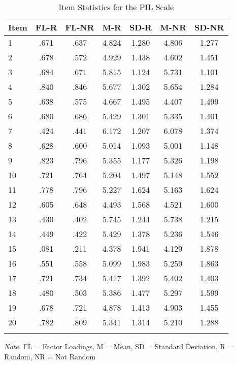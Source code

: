 \documentclass[english,man, mask]{apa6}
\theoremstyle{definition}
\theoremstyle{definition}
\theoremstyle{definition}
\theoremstyle{remark}
\begin{document}
\begin{table}[tbp]
\begin{center}
\begin{threeparttable}
\caption{\label{tab:Ptable}Item Statistics for the PIL Scale}
\begin{tabular}{lcccccc}
\toprule
Item & \multicolumn{1}{c}{FL-R} & \multicolumn{1}{c}{FL-NR} & \multicolumn{1}{c}{M-R} & \multicolumn{1}{c}{SD-R} & \multicolumn{1}{c}{M-NR} & \multicolumn{1}{c}{SD-NR}\\
\midrule
1 & .671 & .637 & 4.824 & 1.280 & 4.806 & 1.277\\
2 & .678 & .572 & 4.929 & 1.438 & 4.602 & 1.451\\
3 & .684 & .671 & 5.815 & 1.124 & 5.731 & 1.101\\
4 & .840 & .846 & 5.677 & 1.302 & 5.654 & 1.284\\
5 & .638 & .575 & 4.667 & 1.495 & 4.407 & 1.499\\
6 & .680 & .686 & 5.429 & 1.301 & 5.335 & 1.401\\
7 & .424 & .441 & 6.172 & 1.207 & 6.078 & 1.374\\
8 & .628 & .600 & 5.014 & 1.093 & 5.001 & 1.148\\
9 & .823 & .796 & 5.355 & 1.177 & 5.326 & 1.198\\
10 & .721 & .764 & 5.204 & 1.497 & 5.148 & 1.552\\
11 & .778 & .796 & 5.227 & 1.624 & 5.163 & 1.624\\
12 & .605 & .648 & 4.493 & 1.568 & 4.521 & 1.600\\
13 & .430 & .402 & 5.745 & 1.244 & 5.738 & 1.215\\
14 & .449 & .422 & 5.429 & 1.378 & 5.236 & 1.546\\
15 & .081 & .211 & 4.378 & 1.941 & 4.129 & 1.878\\
16 & .551 & .558 & 5.099 & 1.983 & 5.259 & 1.863\\
17 & .721 & .734 & 5.417 & 1.392 & 5.402 & 1.403\\
18 & .480 & .503 & 5.386 & 1.477 & 5.297 & 1.599\\
19 & .678 & .721 & 4.878 & 1.413 & 4.903 & 1.455\\
20 & .782 & .809 & 5.341 & 1.314 & 5.210 & 1.288\\
\bottomrule
\addlinespace
\end{tabular}
\begin{tablenotes}[para]
\textit{Note.} FL = Factor Loadings, M = Mean, SD = Standard Deviation, R = Random, NR = Not Random
\end{tablenotes}
\end{threeparttable}
\end{center}
\end{table}
\end{document}
